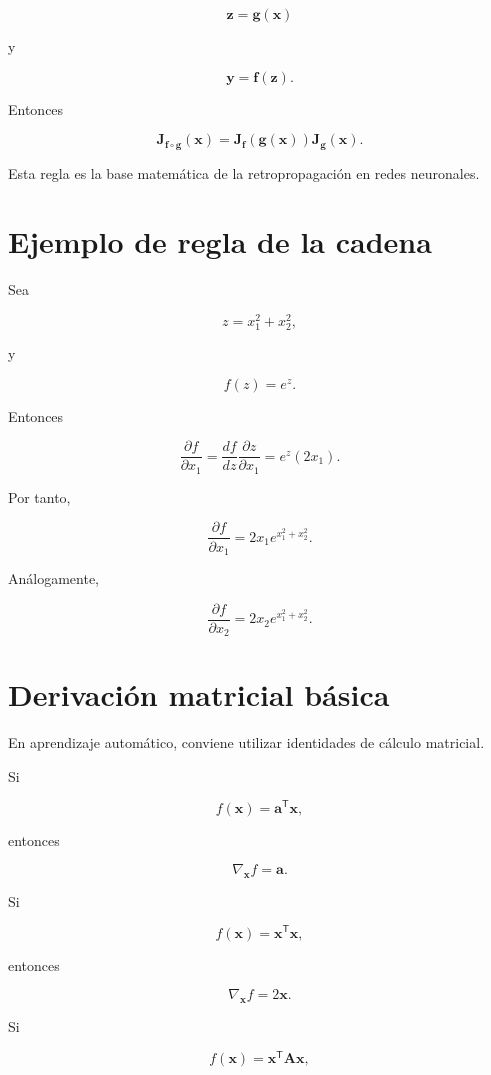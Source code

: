 \documentclass[
  spanish,
  11pt,
  letterpaper,
  DIV=11,
  numbers=noendperiod]{scrreprt}
\theoremstyle{definition}
\theoremstyle{plain}
\theoremstyle{definition}
\theoremstyle{remark}
\begin{document}
\[
\mathbf{z}
=
\mathbf{g}(\mathbf{x})
\]

y

\[
\mathbf{y}
=
\mathbf{f}(\mathbf{z}).
\]

Entonces

\[
\mathbf{J}_{\mathbf{f}\circ\mathbf{g}}(\mathbf{x})
=
\mathbf{J}_{\mathbf{f}}(\mathbf{g}(\mathbf{x}))
\mathbf{J}_{\mathbf{g}}(\mathbf{x}).
\]

Esta regla es la base matemática de la retropropagación en redes
neuronales.

\section{Ejemplo de regla de la
cadena}\label{ejemplo-de-regla-de-la-cadena}

Sea

\[
z=x_1^2+x_2^2,
\]

y

\[
f(z)=e^z.
\]

Entonces

\[
\frac{\partial f}{\partial x_1}
=
\frac{df}{dz}
\frac{\partial z}{\partial x_1}
=
e^z(2x_1).
\]

Por tanto,

\[
\frac{\partial f}{\partial x_1}
=
2x_1e^{x_1^2+x_2^2}.
\]

Análogamente,

\[
\frac{\partial f}{\partial x_2}
=
2x_2e^{x_1^2+x_2^2}.
\]

\section{Derivación matricial
básica}\label{derivaciuxf3n-matricial-buxe1sica}

En aprendizaje automático, conviene utilizar identidades de cálculo
matricial.

Si

\[
f(\mathbf{x})
=
\mathbf{a}^{\mathsf T}\mathbf{x},
\]

entonces

\[
\nabla_{\mathbf{x}}f
=
\mathbf{a}.
\]

Si

\[
f(\mathbf{x})
=
\mathbf{x}^{\mathsf T}\mathbf{x},
\]

entonces

\[
\nabla_{\mathbf{x}}f
=
2\mathbf{x}.
\]

Si

\[
f(\mathbf{x})
=
\mathbf{x}^{\mathsf T}
\mathbf{A}
\mathbf{x},
\]
\end{document}
